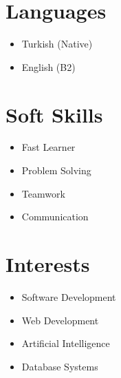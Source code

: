 \documentclass{article}
\begin{document}
\section*{Languages}

\begin{itemize}
\item Turkish (Native)
\item English (B2)
\end{itemize}

\section*{Soft Skills}

\begin{itemize}
\item Fast Learner
\item Problem Solving
\item Teamwork
\item Communication
\end{itemize}

\section*{Interests}

\begin{itemize}
\item Software Development
\item Web Development
\item Artificial Intelligence
\item Database Systems
\end{itemize}
\end{document}
